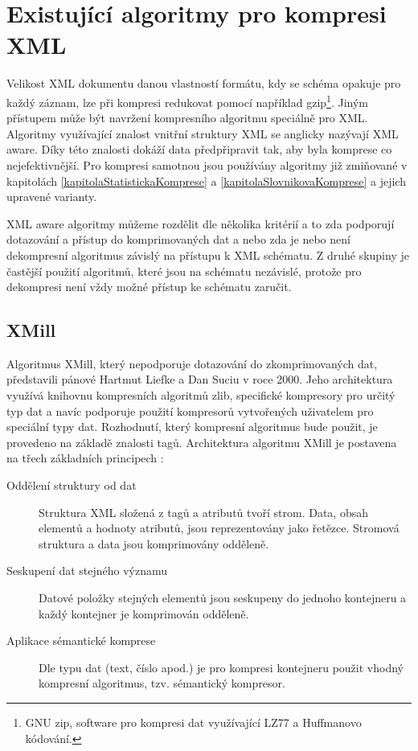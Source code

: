 \chapter{Existující algoritmy pro kompresi XML}
\label{kapitolaXmlAlgoritmy}

Velikost XML dokumentu danou vlastností formátu, kdy se schéma opakuje pro každý záznam, lze při kompresi redukovat pomocí například gzip\footnote{GNU zip, software pro kompresi dat využívající LZ77 a Huffmanovo kódování.}. Jiným přístupem může být navržení kompresního algoritmu speciálně pro XML. Algoritmy využívající znalost vnitřní struktury XML se anglicky nazývají XML aware. Díky této znalosti dokáží data předpřipravit tak, aby byla komprese co nejefektivnější. Pro kompresi samotnou jsou používány algoritmy již zmiňované v kapitolách \ref{kapitolaStatistickaKomprese} a \ref{kapitolaSlovnikovaKomprese} a jejich upravené varianty.

XML aware algoritmy můžeme rozdělit dle několika kritérií a to zda podporují dotazování a přístup do komprimovaných dat a nebo zda je nebo není dekompresní algoritmus závislý na přístupu k XML schématu. Z druhé skupiny je častější použití algoritmů, které jsou na schématu nezávislé, protože pro dekompresi není vždy možné přístup ke schématu zaručit.

\section{XMill}
Algoritmus XMill, který nepodporuje dotazování do zkomprimovaných dat, představili pánové Hartmut Liefke a Dan Suciu v roce 2000. Jeho architektura využívá knihovnu kompresních algoritmů zlib, specifické kompresory pro určitý typ dat a navíc podporuje použití kompresorů vytvořených uživatelem pro speciální typy dat. Rozhodnutí, který kompresní algoritmus bude použit, je provedeno na základě znalosti tagů. Architektura algoritmu XMill je postavena na třech základních principech \cite{xmill}:

\begin{description}
\item[Oddělení struktury od dat] Struktura XML složená z tagů a atributů tvoří strom. Data, obsah elementů a hodnoty atributů, jsou reprezentovány jako řetězce. Stromová struktura a data jsou komprimovány odděleně.
\item[Seskupení dat stejného významu] Datové položky stejných elementů jsou seskupeny do jednoho kontejneru a každý kontejner je komprimován odděleně.
\item[Aplikace sémantické komprese] Dle typu dat (text, číslo apod.) je pro kompresi kontejneru použit vhodný kompresní algoritmus, tzv. sémantický kompresor.
\end{description}

